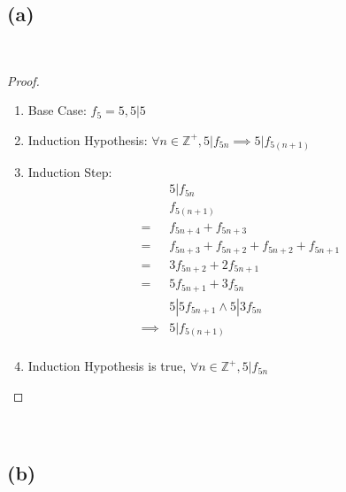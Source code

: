 \documentclass{article}
\begin{document}
\subsection*{(a)}
~
\begin{proof}
    ~
    \begin{enumerate}
        \item Base Case: $f_5=5, 5|5$
        \item Induction Hypothesis: $\forall n\in \mathbb{Z^+},5|f_{5n}\implies 5|f_{5(n+1)}$
        \item Induction Step:
        \begin{align*}
            &5|f_{5n}\\
            &f_{5(n+1)}\\
            =&f_{5n+4}+f_{5n+3}\\
            =&f_{5n+3}+f_{5n+2}+f_{5n+2}+f_{5n+1}\\
            =&3f_{5n+2}+2f_{5n+1}\\
            =&5f_{5n+1}+3f_{5n}\\
            &5|5f_{5n+1}\land 5|3f_{5n}\\
            \implies&5|f_{5(n+1)}\\
        \end{align*}
        \item Induction Hypothesis is true, $\forall n\in \mathbb{Z^+},5|f_{5n}$
    \end{enumerate}
\end{proof}

~

\subsection*{(b)}

~
\end{document}
